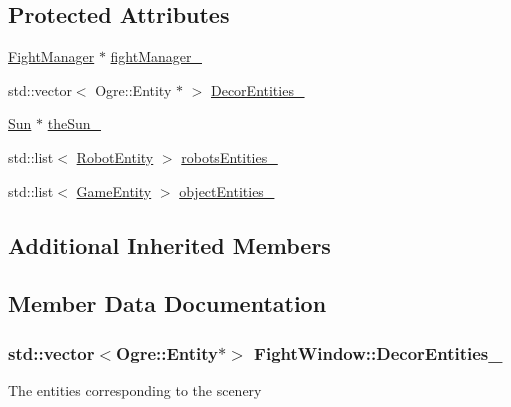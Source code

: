 \subsection*{Protected Attributes}
\begin{DoxyCompactItemize}
\item 
\hyperlink{class_fight_manager}{Fight\+Manager} $\ast$ \hyperlink{class_fight_window_a5353954a2361e6ecd1a91f2882c6ed76}{fight\+Manager\+\_\+}
\item 
std\+::vector$<$ Ogre\+::\+Entity $\ast$ $>$ \hyperlink{class_fight_window_a6c0baedcad2a8d6d6f051b27c73ad5ec}{Decor\+Entities\+\_\+}
\item 
\hyperlink{class_fight_window_1_1_sun}{Sun} $\ast$ \hyperlink{class_fight_window_ac0efa5268674b08d31c3adc7dc3ab7a3}{the\+Sun\+\_\+}
\item 
std\+::list$<$ \hyperlink{class_fight_window_1_1_robot_entity}{Robot\+Entity} $>$ \hyperlink{class_fight_window_a07cdb20ba127910023e0bd45f4b007a8}{robots\+Entities\+\_\+}
\item 
std\+::list$<$ \hyperlink{class_fight_window_1_1_game_entity}{Game\+Entity} $>$ \hyperlink{class_fight_window_af9ed710d89b1a0a0ab326d3bcd55a072}{object\+Entities\+\_\+}
\end{DoxyCompactItemize}
\subsection*{Additional Inherited Members}


\subsection{Member Data Documentation}
\subsubsection[{\texorpdfstring{Decor\+Entities\+\_\+}{DecorEntities_}}]{\setlength{\rightskip}{0pt plus 5cm}std\+::vector$<$Ogre\+::\+Entity$\ast$$>$ Fight\+Window\+::\+Decor\+Entities\+\_\+\hspace{0.3cm}{\ttfamily [protected]}}\hypertarget{class_fight_window_a6c0baedcad2a8d6d6f051b27c73ad5ec}{}\label{class_fight_window_a6c0baedcad2a8d6d6f051b27c73ad5ec}
The entities corresponding to the scenery 
